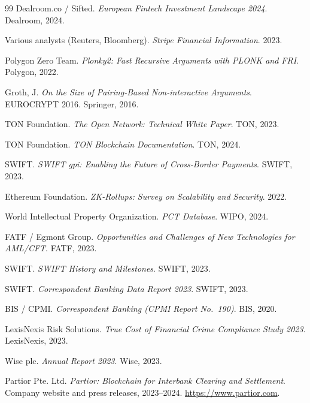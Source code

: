 \documentclass[11pt,a4paper]{article}
\begin{document}
\begin{thebibliography}{99}
Dealroom.co / Sifted. \textit{European Fintech Investment Landscape 2024}. Dealroom, 2024.

Various analysts (Reuters, Bloomberg). \textit{Stripe Financial Information}. 2023.

Polygon Zero Team.
\textit{Plonky2: Fast Recursive Arguments with PLONK and FRI}.
Polygon, 2022.

Groth, J.
\textit{On the Size of Pairing-Based Non-interactive Arguments}.
EUROCRYPT 2016. Springer, 2016.

TON Foundation. \textit{The Open Network: Technical White Paper}. TON, 2023.

TON Foundation. \textit{TON Blockchain Documentation}. TON, 2024.

SWIFT. \textit{SWIFT gpi: Enabling the Future of Cross-Border Payments}. SWIFT, 2023.

Ethereum Foundation. \textit{ZK-Rollups: Survey on Scalability and Security}. 2022.

World Intellectual Property Organization. \textit{PCT Database}. WIPO, 2024.

FATF / Egmont Group. \textit{Opportunities and Challenges of New Technologies for AML/CFT}. FATF, 2023.

SWIFT. \textit{SWIFT History and Milestones}. SWIFT, 2023.

SWIFT. \textit{Correspondent Banking Data Report 2023}. SWIFT, 2023.

BIS / CPMI. \textit{Correspondent Banking (CPMI Report No.\ 190)}. BIS, 2020.

LexisNexis Risk Solutions. \textit{True Cost of Financial Crime Compliance Study 2023}. LexisNexis, 2023.

Wise plc. \textit{Annual Report 2023}. Wise, 2023.

Partior Pte. Ltd. \textit{Partior: Blockchain for Interbank Clearing and Settlement}. Company website and press releases, 2023--2024. \url{https://www.partior.com}.


\end{thebibliography}
\end{document}
